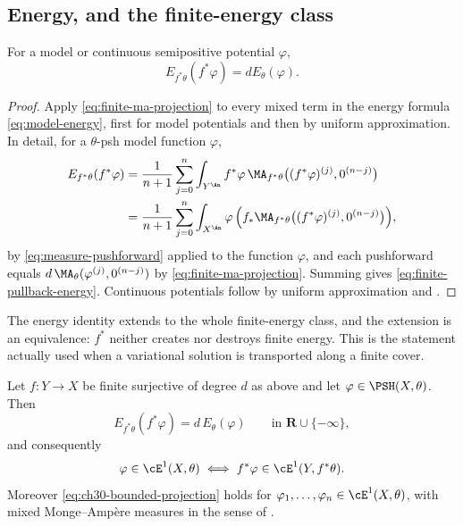 \subsection{Energy, and the finite-energy class}
\label{sec:ch30-finite-energy}

\begin{corollary}\label{cor:finite-pullback-energy}
For a model or continuous semipositive potential $\varphi$,
\begin{equation}
\label{eq:finite-pullback-energy}
               E_{f^*\theta}(f^*\varphi)
               =dE_\theta(\varphi).
\end{equation}
\end{corollary}

\begin{proof}
Apply \eqref{eq:finite-ma-projection} to every mixed term in the energy
formula \eqref{eq:model-energy}, first for model potentials and then by
uniform approximation.  In detail, for a $\theta$-psh model function
$\varphi$,
\[
\begin{aligned}
 E_{f^*\theta}(f^*\varphi)
 &=\frac1{n+1}\sum_{j=0}^n\int_{Y^{\An}}f^*\varphi\,
    \MA_{f^*\theta}\bigl((f^*\varphi)^{(j)},0^{(n-j)}\bigr)\\
 &=\frac1{n+1}\sum_{j=0}^n\int_{X^{\An}}\varphi\,
    \Bigl(f_*\MA_{f^*\theta}\bigl((f^*\varphi)^{(j)},0^{(n-j)}\bigr)\Bigr),
\end{aligned}
\]
by \eqref{eq:measure-pushforward} applied to the function $\varphi$, and
each pushforward equals $d\,\MA_\theta(\varphi^{(j)},0^{(n-j)})$ by
\eqref{eq:finite-ma-projection}.  Summing gives
\eqref{eq:finite-pullback-energy}.  Continuous potentials follow by uniform
approximation and .
\end{proof}

The energy identity extends to the whole finite-energy class, and the
extension is an equivalence: $f^*$ neither creates nor destroys finite
energy.  This is the statement actually used when a variational solution is
transported along a finite cover.

\begin{theorem}
\label{thm:ch30-finite-energy-transfer}
Let $f:Y\to X$ be finite surjective of degree $d$ as above and let
$\varphi\in\PSH(X,\theta)$.  Then
\begin{equation}
\label{eq:ch30-finite-energy-general}
 E_{f^*\theta}(f^*\varphi)=d\,E_\theta(\varphi)
 \qquad\text{in }\mathbf R\cup\{-\infty\},
\end{equation}
and consequently
\[
 \varphi\in\cE^1(X,\theta)
 \iff
 f^*\varphi\in\cE^1(Y,f^*\theta).
\]
Moreover \eqref{eq:ch30-bounded-projection} holds for
$\varphi_1,\ldots,\varphi_n\in\cE^1(X,\theta)$, with mixed
Monge--Amp\`ere measures in the sense of .
\end{theorem}

